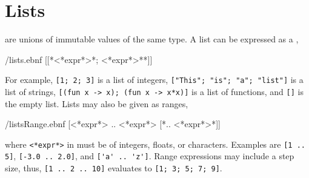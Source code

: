 \documentclass[springer.tex]{subfiles}
\begin{document}

\chapter{Lists}
 are unions of immutable values of the same type. A list can be expressed as a ,
%
\begin{verbatimwrite}{\ebnf/lists.ebnf}
[[*<*expr*>{*; <*expr*>*}*]]
\end{verbatimwrite}
%
For example, \mbox{\lstinline![1; 2; 3]!} is a list of integers, \mbox{\lstinline!["This"; "is"; "a"; "list"]!} is a list of strings, \mbox{\lstinline![(fun x -> x); (fun x -> x*x)]!} is a list of functions, and \lstinline![]! is the empty list. Lists may also be given as ranges,
%
\begin{verbatimwrite}{\ebnf/listsRange.ebnf}
[<*expr*> .. <*expr*> [*.. <*expr*>*]]
\end{verbatimwrite}
%
where \lstinline[language=syntax]{<*expr*>} in  must be of integers, floats, or characters. Examples are \mbox{\lstinline![1 .. 5]!}, \mbox{\lstinline![-3.0 .. 2.0]!}, and \mbox{\lstinline!['a' .. 'z']!}. Range expressions may include a step size, thus, \mbox{\lstinline![1 .. 2 .. 10]!} evaluates to \mbox{\lstinline![1; 3; 5; 7; 9]!}.
\end{document}

